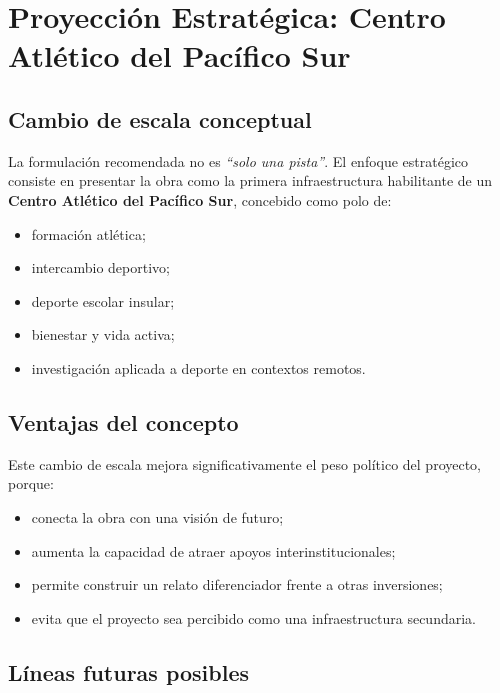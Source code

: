 \documentclass[12pt,letterpaper]{article}
\begin{document}
\section{Proyección Estratégica: Centro Atlético del Pacífico Sur}

\subsection{Cambio de escala conceptual}

La formulación recomendada no es \textit{``solo una pista''}. El enfoque estratégico consiste en presentar la obra como la primera infraestructura habilitante de un \textbf{Centro Atlético del Pacífico Sur}, concebido como polo de:

\begin{itemize}
    \item formación atlética;
    \item intercambio deportivo;
    \item deporte escolar insular;
    \item bienestar y vida activa;
    \item investigación aplicada a deporte en contextos remotos.
\end{itemize}

\subsection{Ventajas del concepto}

Este cambio de escala mejora significativamente el peso político del proyecto, porque:

\begin{itemize}
    \item conecta la obra con una visión de futuro;
    \item aumenta la capacidad de atraer apoyos interinstitucionales;
    \item permite construir un relato diferenciador frente a otras inversiones;
    \item evita que el proyecto sea percibido como una infraestructura secundaria.
\end{itemize}

\subsection{Líneas futuras posibles}
\end{document}
